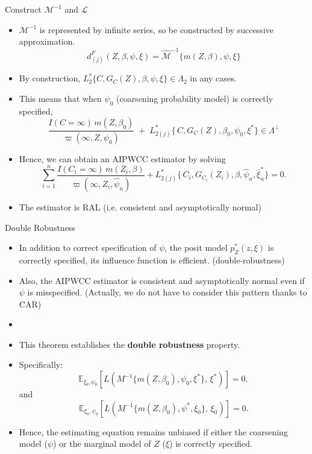\documentclass[xcolor=dvipsnames,aspectratio=169]{beamer}
\newcommand{\1}{\mathbbm{1}}
\begin{document}
\begin{frame}{Construct $\mathcal{M}^{-1}$ and $\mathcal{L}$}
  \begin{itemize}
    \item $\mathcal{M}^{-1}$ is represented by infinite series, so be constructed by successive approximation.
    \[
    d^F_{(j)}(Z,\beta,\psi,\xi) = \hat{\mathcal{M}}^{-1}\{m(Z,\beta),\psi,\xi\}
    \]
    \item By construction, $L^{\ast}_2\{C,G_C(Z),\beta,\psi,\xi\}\in \Lambda_2$ in any cases.
    \item This means that when $\psi_0$ (coarsening probability model) is correctly specified, 
    \[
    \frac{I(C=\infty)\,m(Z,\beta_{0})}{\varpi(\infty,Z,\psi_{0})}
\;+\;
L^{\ast}_{2(j)}\{\,C,G_{C}(Z),\beta_{0},\psi_{0},\xi^{\ast}\}\in \Lambda^{\perp}
    \]
    \item Hence, we can obtain an AIPWCC estimator by solving
    \[
    \sum_{i=1}^{n}
  \frac{I(C_{i}=\infty)\,m(Z_{i},\beta)}
       {\varpi(\infty,Z_{i},\hat{\psi}_{n})}
  + L^{\ast}_{2(j)}\{\,C_{i},G_{C_{i}}(Z_{i}),\beta,\hat{\psi}_{n},\hat{\xi}^{\ast}_{n}\}
= 0.
    \]
    \item The estimator is RAL (i.e. consistent and asymptotically normal)
  \end{itemize}
\end{frame}

\begin{frame}{Double Robustness}
  \begin{itemize}
    \item In addition to correct specification of $\psi$, the posit model $p_Z^*(z,\xi)$ is correctly specified, its influence function is \alert{efficient}. (double-robustness)
    \item Also, the AIPWCC estimator is consistent and asymptotically normal even if $\psi$ is misspecified. (Actually, we do not have to consider this pattern \alert{thanks to CAR})
    \item 
  \end{itemize}
\end{frame}

\begin{frame}
  \begin{tcolorbox}[colframe=Cyan,title=Theorem 10.8]
    \begin{itemize}
      \item This theorem establishes the \textbf{double robustness} property.
      \item Specifically:
      \[
        \mathbb{E}_{\xi_0,\psi_0}
        \left[
          L\!\left(M^{-1}\{m(Z,\beta_0),\psi_0,\xi^\ast\},\,\xi^\ast\right)
        \right] = 0,
      \]
      and
      \[
        \mathbb{E}_{\xi_0,\psi_0}
        \left[
          L\!\left(M^{-1}\{m(Z,\beta_0),\psi^\ast,\xi_0\},\,\xi_0\right)
        \right] = 0.
      \]
      \item Hence, the estimating equation remains unbiased if either
      the coarsening model ($\psi$) or the marginal model of $Z$ ($\xi$) is correctly specified.
    \end{itemize}
  \end{tcolorbox}
\end{frame}
\end{document}
